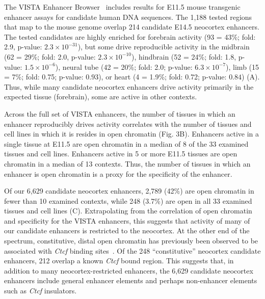 The VISTA Enhancer Browser~\citep{Pennacchio2006} includes results for E11.5 mouse transgenic enhancer assays for candidate human
DNA sequences.  The 1,188 tested regions that map to the mouse genome overlap 214 candidate E14.5 neocortex enhancers.  The tested
candidates are highly enriched for forebrain activity (93 = 43\%; fold: 2.9, p-value: $2.3\times10^{-31}$), but
some drive reproducible activity in the midbrain (62 = 29\%; fold: 2.0, p-value: $2.3\times10^{-10}$),
hindbrain (52 = 24\%; fold: 1.8, p-value: $1.5\times10^{-6}$), neural tube (42 = 20\%; fold: 2.0;
p-value: $6.3\times10^{-7}$), limb (15 = 7\%; fold: 0.75; p-value: $0.93$), or heart
(4 = 1.9\%; fold: 0.72; p-value: $0.84$) (A).  Thus, while many candidate neocortex enhancers
drive activity primarily in the expected tissue (forebrain), some are active in other contexts.

Across the full set of VISTA enhancers, the number of tissues in which an enhancer reproducibly drives activity correlates with
the number of tissues and cell lines in which it is resides in open chromatin (Fig. 3B).  Enhancers active in a single tissue at E11.5
are open chromatin in a median of 8 of the 33 examined tissues and cell lines.  Enhancers active in 5 or more E11.5 tissues are open
chromatin in a median of 13 contexts.  Thus, the number of tissues in which an enhancer is open chromatin is a proxy for the specificity
of the enhancer.

Of our 6,629 candidate neocortex enhancers, 2,789 (42\%) are open chromatin in fewer than 10 examined contexts, while 248 (3.7\%) are open
in all 33 examined tissues and cell lines (C).  Extrapolating from the correlation of open chromatin and specificity
for the VISTA enhancers, this suggests that activity of many of our candidate enhancers is restricted to the neocortex.  At the other
end of the spectrum, constitutive, distal open chromatin has previously been observed to be associated with \textit{Ctcf} binding sites~\citep{Heintzman2009}.
Of the 248 ``constitutive'' neocortex candidate enhancers, 212 overlap a known \textit{Ctcf} bound region.  This suggests that, in addition to many
neocortex-restricted enhancers, the 6,629 candidate neocortex enhancers include general enhancer elements and perhaps non-enhancer elements
such as \textit{Ctcf} insulators.

